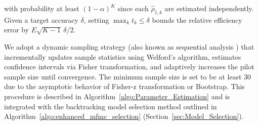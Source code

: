 %
with probability at least $(1-\alpha)^K$ since each $\widehat \rho_{1,k}$ are estimated independently. Given a target accuracy $\delta$, setting $\max_k t_k \leq \delta$ bounds the relative efficiency error by $E \sqrt{K-1} \, \delta / 2$. 




 
 

We adopt a dynamic sampling strategy (also known as sequential analysis \cite{La:2001,Wa:1947}) that incrementally updates sample statistics using Welford’s algorithm, estimates confidence intervals via Fisher transformation, and adaptively increases the pilot sample size until convergence. The minimum sample size is set to be at least 30 due to the asymptotic behavior of Fisher-z transformation or Bootstrap. This procedure is described in Algorithm~\ref{algo:Parameter_Estimation} and is integrated with the backtracking model selection method outlined in Algorithm~\ref{algo:enhanced_mfmc_selection} (Section~\ref{sec:Model_Selection}).








